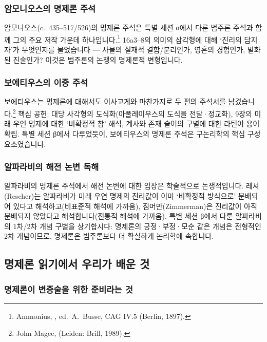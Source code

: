 \documentclass[12pt, a4paper]{article}
\begin{document}
\subsubsection{암모니오스의 명제론 주석}

암모니오스(c.\ 435--517/526)의 명제론 주석은 특별 세션 α에서 다룬 범주론 주석과 함께 그의 주요 저작 가운데 하나입니다.\footnote{Ammonius, , ed.\ A.\ Busse, CAG IV.5 (Berlin, 1897).} 16a3--8의 의미의 삼각형에 대해 `진리의 담지자'가 무엇인지를 물었습니다 --- 사물의 실재적 결합/분리인가, 영혼의 경험인가, 발화된 진술인가? 이것은 범주론의  논쟁의 명제론적 변형입니다.

\subsubsection{보에티우스의 이중 주석}

보에티우스는 명제론에 대해서도 이사고게와 마찬가지로 두 편의 주석서를 남겼습니다.\footnote{John Magee,  (Leiden: Brill, 1989).} 핵심 공헌: 대당 사각형의 도식화(아풀레이우스의 도식을 전달·정교화), 9장의 미래 우연 명제에 대한 `비확정적 참' 해석, 계사와 존재 술어의 구별에 대한 라틴어 용어 확립. 특별 세션 β에서 다루었듯이, 보에티우스의 명제론 주석은 구논리학의 핵심 구성 요소였습니다.

\subsubsection{알파라비의 해전 논변 독해}

알파라비의 명제론 주석에서 해전 논변에 대한 입장은 학술적으로 논쟁적입니다. 레셔(Rescher)는 알파라비가 미래 우연 명제의 진리값이 이미 `비확정적 방식으로' 분배되어 있다고 해석하고(비표준적 해석에 가까움), 짐머만(Zimmerman)은 진리값이 아직 분배되지 않았다고 해석합니다(전통적 해석에 가까움). 특별 세션 β에서 다룬 알파라비의 1차/2차 개념 구별을 상기합시다: 명제론의 긍정·부정·모순 같은 개념은 전형적인 2차 개념이므로, 명제론은 범주론보다 더 확실하게 논리학에 속합니다.

\subsection{명제론 읽기에서 우리가 배운 것}

\subsubsection{명제론이 변증술을 위한 준비라는 것}
\end{document}
